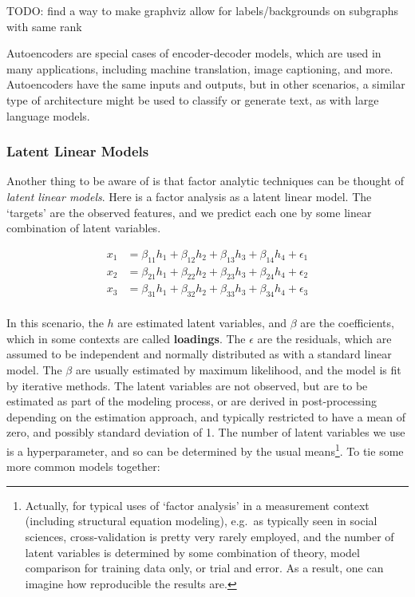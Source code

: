\documentclass[
  letterpaper,
]{krantz}
\begin{document}
TODO: find a way to make graphviz allow for labels/backgrounds on
subgraphs with same rank

\begin{tcolorbox}[enhanced jigsaw, opacityback=0, leftrule=.75mm, bottomrule=.15mm, colframe=quarto-callout-note-color-frame, rightrule=.15mm, breakable, left=2mm, colback=white, arc=.35mm, toprule=.15mm]

Autoencoders are special cases of encoder-decoder models, which are used
in many applications, including machine translation, image captioning,
and more. Autoencoders have the same inputs and outputs, but in other
scenarios, a similar type of architecture might be used to classify or
generate text, as with large language models.

\end{tcolorbox}

\subsubsection{Latent Linear Models}\label{latent-linear-models}

Another thing to be aware of is that factor analytic techniques can be
thought of \emph{latent linear models}. Here is a factor analysis as a
latent linear model. The `targets' are the observed features, and we
predict each one by some linear combination of latent variables.

\[
\begin{aligned}
x_1 &= \beta_{11} h_1 + \beta_{12} h_2 + \beta_{13} h_3 + \beta_{14} h_4 + \epsilon_1 \\
x_2 &= \beta_{21} h_1 + \beta_{22} h_2 + \beta_{23} h_3 + \beta_{24} h_4 + \epsilon_2 \\
x_3 &= \beta_{31} h_1 + \beta_{32} h_2 + \beta_{33} h_3 + \beta_{34} h_4 + \epsilon_3 \\
\end{aligned}
\]

In this scenario, the \(h\) are estimated latent variables, and
\(\beta\) are the coefficients, which in some contexts are called
\textbf{loadings}. The \(\epsilon\) are the residuals, which are assumed
to be independent and normally distributed as with a standard linear
model. The \(\beta\) are usually estimated by maximum likelihood, and
the model is fit by iterative methods. The latent variables are not
observed, but are to be estimated as part of the modeling process, or
are derived in post-processing depending on the estimation approach, and
typically restricted to have a mean of zero, and possibly standard
deviation of 1. The number of latent variables we use is a
hyperparameter, and so can be determined by the usual means\footnote{Actually,
  for typical uses of `factor analysis' in a measurement context
  (including structural equation modeling), e.g.~as typically seen in
  social sciences, cross-validation is pretty very rarely employed, and
  the number of latent variables is determined by some combination of
  theory, model comparison for training data only, or trial and error.
  As a result, one can imagine how reproducible the results are.}. To
tie some more common models together:
\end{document}
